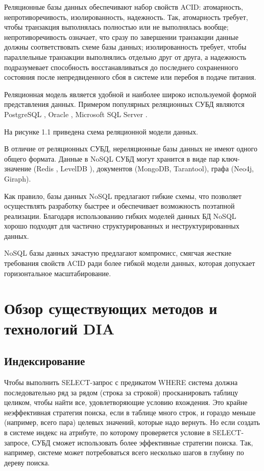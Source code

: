 Реляционные базы данных обеспечивают набор свойств ACID: атомарность, непротиворечивость, изолированность, надежность. Так, атомарность требует, чтобы транзакция выполнялась полностью или не выполнялась вообще; непротиворечивость означает, что сразу по завершении транзакции данные должны соответствовать схеме базы данных; изолированность требует, чтобы параллельные транзакции выполнялись отдельно друг от друга, а надежность подразумевает способность восстанавливаться до последнего сохраненного состояния после непредвиденного сбоя в системе или перебоя в подаче питания.

Реляционная модель является удобной и наиболее широко используемой формой представления данных. Примером популярных реляционных СУБД являются PostgreSQL \cite{postgres}, Oracle \cite{oracle}, Microsoft SQL Server \cite{mssql}.

На рисунке 1.1 приведена схема реляционной модели данных.


В отличие от реляционных СУБД, нереляционные базы данных не имеют одного общего формата. Данные в NoSQL СУБД могут хранится в виде пар ключ-значение (Redis \cite{redis}, LevelDB \cite{leveldb}), документов (MongoDB, Tarantool), графа (Neo4j, Giraph).

Как правило, базы данных NoSQL предлагают гибкие схемы, что позволяет осуществлять разработку быстрее и обеспечивает возможность поэтапной реализации. Благодаря использованию гибких моделей данных БД NoSQL хорошо подходят для частично структурированных и неструктурированных данных.

NoSQL базы данных зачастую предлагают компромисс, смягчая жесткие требования свойств ACID ради более гибкой модели данных, которая допускает горизонтальное масштабирование.




\section{Обзор существующих методов и технологий DIA}

\subsection{Индексирование}

Чтобы выполнить SELECT-запрос с предикатом WHERE система должна последовательно ряд за рядом (строка за строкой) просканировать таблицу целиком, чтобы найти все, удовлетворяющие условию вхождения. Это крайне неэффективная стратегия поиска, если в таблице много строк, и гораздо меньше (например, всего пара) целевых значений, которые надо вернуть. Но если создать в системе индекс на атрибуте, по которому проверяется условие в SELECT-запросе, СУБД сможет использовать более эффективные стратегии поиска. Так, например, системе может потребоваться всего несколько шагов в глубину по дереву поиска.


